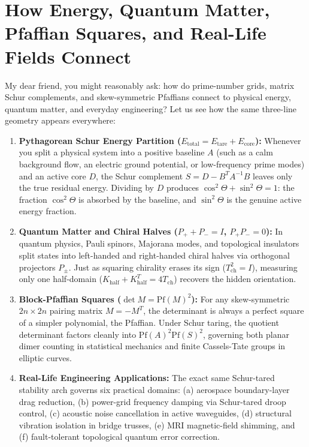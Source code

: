 \documentclass[11pt,a4paper]{article}
\begin{document}
\section{How Energy, Quantum Matter, Pfaffian Squares, and Real-Life Fields Connect}

My dear friend, you might reasonably ask: how do prime-number grids, matrix Schur complements, and skew-symmetric Pfaffians connect to physical energy, quantum matter, and everyday engineering? Let us see how the same three-line geometry appears everywhere:

\begin{enumerate}
  \item \textbf{Pythagorean Schur Energy Partition ($E_{\mathrm{total}} = E_{\mathrm{tare}} + E_{\mathrm{core}}$):} Whenever you split a physical system into a positive baseline $A$ (such as a calm background flow, an electric ground potential, or low-frequency prime modes) and an active core $D$, the Schur complement $S = D - B^T A^{-1} B$ leaves only the true residual energy. Dividing by $D$ produces $\cos^2\Theta + \sin^2\Theta = 1$: the fraction $\cos^2\Theta$ is absorbed by the baseline, and $\sin^2\Theta$ is the genuine active energy fraction.
  \item \textbf{Quantum Matter and Chiral Halves ($P_+ + P_- = I$, $P_+ P_- = 0$):} In quantum physics, Pauli spinors, Majorana modes, and topological insulators split states into left-handed and right-handed chiral halves via orthogonal projectors $P_\pm$. Just as squaring chirality erases its sign ($T_{\mathrm{ch}}^2 = I$), measuring only one half-domain ($K_{\mathrm{half}} + K_{\mathrm{half}}^T = 4 T_{\mathrm{ch}}$) recovers the hidden orientation.
  \item \textbf{Block-Pfaffian Squares ($\det M = \mathrm{Pf}(M)^2$):} For any skew-symmetric $2n \times 2n$ pairing matrix $M = -M^T$, the determinant is always a perfect square of a simpler polynomial, the Pfaffian. Under Schur taring, the quotient determinant factors cleanly into $\mathrm{Pf}(A)^2 \mathrm{Pf}(S)^2$, governing both planar dimer counting in statistical mechanics and finite Cassels-Tate groups in elliptic curves.
  \item \textbf{Real-Life Engineering Applications:} The exact same Schur-tared stability arch governs six practical domains: (a) aerospace boundary-layer drag reduction, (b) power-grid frequency damping via Schur-tared droop control, (c) acoustic noise cancellation in active waveguides, (d) structural vibration isolation in bridge trusses, (e) MRI magnetic-field shimming, and (f) fault-tolerant topological quantum error correction.
\end{enumerate}
\end{document}
